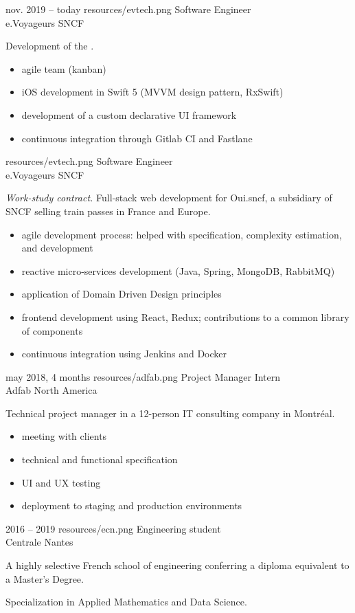\documentclass{cv}
\begin{document}
\noindent\begin{minipage}[t]{.65\textwidth}


\experience
{{nov. 2019 -- today}}
{resources/evtech.png}
{Software Engineer\\e.Voyageurs SNCF}
{
	Development of the \href{https://apps.apple.com/fr/app/oui-sncf-train-et-bus/id343889987}{}. 

	\begin{itemize}
		\item agile team (kanban)
		\item iOS development in Swift 5 (MVVM design pattern, RxSwift)
		\item development of a custom declarative UI framework
		\item continuous integration through Gitlab CI and Fastlane
	\end{itemize}
}

{resources/evtech.png}
{Software Engineer\\e.Voyageurs SNCF}
{
	\textit{Work-study contract.} Full-stack web development for Oui.sncf, a subsidiary of SNCF selling train passes in France and Europe. 

	\begin{itemize}
		\item agile development process: helped with specification, complexity estimation, and development
		\item reactive micro-services development (Java, Spring, MongoDB, RabbitMQ)
		\item application of Domain Driven Design principles
		\item frontend development using React, Redux; contributions to a common library of components
		\item continuous integration using Jenkins and Docker
	\end{itemize}
}

\experience
{{may 2018,  4 months}}
{resources/adfab.png}
{Project Manager Intern\\Adfab North America}
{
	Technical project manager in a 12-person IT consulting company in Montréal.

	\begin{itemize}
		\item meeting with clients
		\item technical and functional specification
		\item UI and UX testing
		\item deployment to staging and production environments
	\end{itemize}
}

\experience
{{2016 -- 2019}}
{resources/ecn.png}
{Engineering student\\Centrale Nantes}
{
	A highly selective French school of engineering conferring a diploma equivalent to a Master’s Degree. 

	Specialization in Applied Mathematics and Data Science.
}

\end{minipage}
\end{document}

